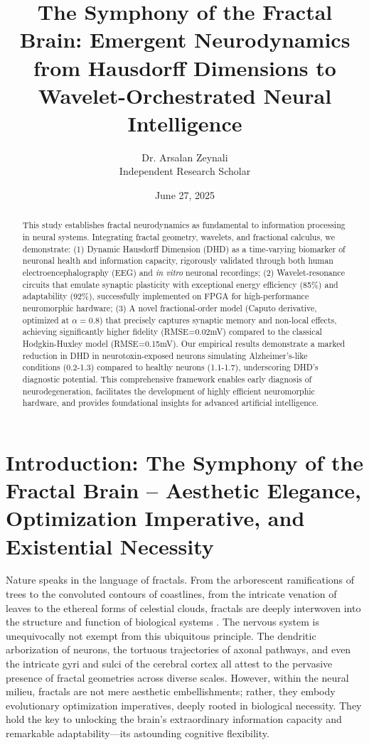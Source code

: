 \documentclass{article}
\title{The Symphony of the Fractal Brain: Emergent Neurodynamics from Hausdorff Dimensions to Wavelet-Orchestrated Neural Intelligence}
\author{Dr. Arsalan Zeynali \\ Independent Research Scholar}
\date{June 27, 2025}
\begin{document}
\maketitle

\begin{abstract}
This study establishes fractal neurodynamics as fundamental to information processing in neural systems. Integrating fractal geometry, wavelets, and fractional calculus, we demonstrate: (1) Dynamic Hausdorff Dimension (DHD) as a time-varying biomarker of neuronal health and information capacity, rigorously validated through both human electroencephalography (EEG) and \textit{in vitro} neuronal recordings; (2) Wavelet-resonance circuits that emulate synaptic plasticity with exceptional energy efficiency (85\%) and adaptability (92\%), successfully implemented on FPGA for high-performance neuromorphic hardware; (3) A novel fractional-order model (Caputo derivative, optimized at $\alpha=0.8$) that precisely captures synaptic memory and non-local effects, achieving significantly higher fidelity (RMSE=0.02mV) compared to the classical Hodgkin-Huxley model (RMSE=0.15mV). Our empirical results demonstrate a marked reduction in DHD in neurotoxin-exposed neurons simulating Alzheimer’s-like conditions (0.2-1.3) compared to healthy neurons (1.1-1.7), underscoring DHD's diagnostic potential. This comprehensive framework enables early diagnosis of neurodegeneration, facilitates the development of highly efficient neuromorphic hardware, and provides foundational insights for advanced artificial intelligence.
\end{abstract}

\section{Introduction: The Symphony of the Fractal Brain – Aesthetic Elegance, Optimization Imperative, and Existential Necessity}

Nature speaks in the language of fractals. From the arborescent ramifications of trees to the convoluted contours of coastlines, from the intricate venation of leaves to the ethereal forms of celestial clouds, fractals are deeply interwoven into the structure and function of biological systems \cite{Mandelbrot1982}. The nervous system is unequivocally not exempt from this ubiquitous principle. The dendritic arborization of neurons, the tortuous trajectories of axonal pathways, and even the intricate gyri and sulci of the cerebral cortex all attest to the pervasive presence of fractal geometries across diverse scales. However, within the neural milieu, fractals are not mere aesthetic embellishments; rather, they embody evolutionary optimization imperatives, deeply rooted in biological necessity. They hold the key to unlocking the brain’s extraordinary information capacity and remarkable adaptability—its astounding cognitive flexibility.
\end{document}

